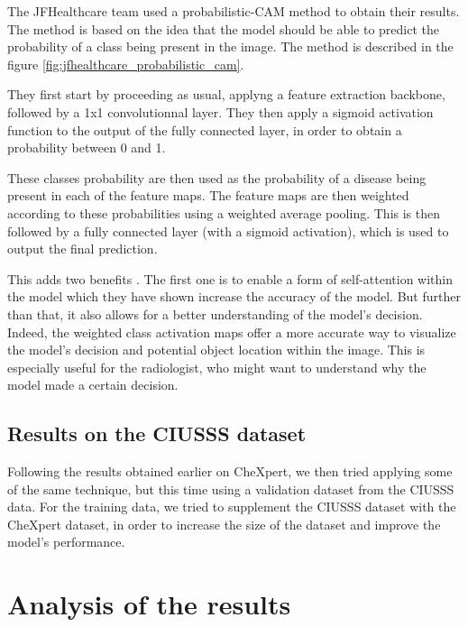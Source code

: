 \documentclass[11pt]{article}
\begin{document}
            The JFHealthcare team \cite{jfhealthcare} used a probabilistic-CAM method to obtain their results.
            The method is based on the idea that the model should be able to predict the probability of a class being
            present in the image. The method is described in the figure \ref{fig:jfhealthcare_probabilistic_cam}.

            They first start by proceeding as usual, applyng a feature extraction backbone, followed by a 1x1 convolutionnal layer.
            They then apply a sigmoid activation function to the output of the fully connected layer, in order to obtain a probability between 0 and 1.

            These classes probability are then used as the probability of a disease being present in each of the feature maps. The feature maps are then
            weighted according to these probabilities using a weighted average pooling. This is then followed by a fully connected layer (with a sigmoid activation), which is used to output
            the final prediction.


            This adds two benefits . The first one is to enable a form of self-attention within the model which they have shown increase the accuracy of the model.
            But further than that, it also allows for a better understanding of the model's decision. Indeed, the weighted class activation maps offer a more accurate way to visualize the model's decision and potential object location
            within the image. This is especially useful for the radiologist, who might want to understand why the model made a certain decision.


        \subsection{Results on the CIUSSS dataset}


            Following the results obtained earlier on CheXpert, we then tried applying some of the same technique, but this time using a validation dataset from the CIUSSS data.
            For the training data, we tried to supplement the CIUSSS dataset with the CheXpert dataset, in order to increase the size of the dataset and improve the model's performance.



    \section{Analysis of the results}
\end{document}
